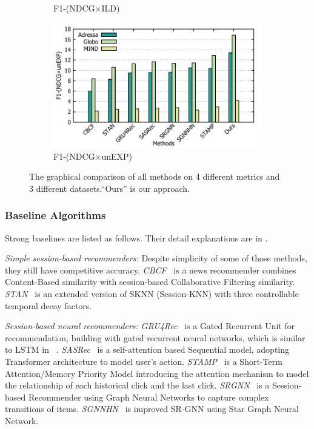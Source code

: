\begin{figure}
\begin{subfigure}[b]{0.8\columnwidth}
  \caption{F1-(NDCG$\times$ILD)}
  \label{fig:ild}
  \end{subfigure}
  \hspace*{5mm}
  \begin{subfigure}[b]{0.8\columnwidth}
  \centering
  \includegraphics[width=\columnwidth]{fig/ndcg-unexp.pdf}
  \caption{F1-(NDCG$\times$unEXP)}
  \label{fig:unexp}
  \end{subfigure}
  \caption{The graphical comparison of all methods on 4 different metrics and 3 different datasets.``Ours'' is our approach.}
  \label{fig:all}
\end{figure}

\subsubsection{Baseline Algorithms}
Strong baselines are listed as follows. Their detail explanations are in .

\textit{Simple session-based recommenders:} Despite simplicity of some of those methods, they still have competitive accuracy. 
\textit{CBCF}~\cite{sottocornola2018session} is a news recommender combines Content-Based similarity with session-based Collaborative Filtering similarity.
\textit{STAN}~\cite{garg2019sequence} is an extended version of SKNN (Session-KNN) with three controllable temporal decay factors.

\textit{Session-based neural recommenders:}
  \textit{GRU4Rec}~\cite{hidasi2015session,hidasi2018recurrent} is a Gated Recurrent Unit for recommendation, building with gated recurrent neural networks, which is similar to LSTM in ~\cite{gabriel2019contextual}.
  \textit{SASRec}~\cite{kang_self-attentive_2018} is a self-attention based Sequential model, adopting Transformer architecture to model user's action.
  \textit{STAMP}~\cite{liu2018stamp} is a Short-Term Attention/Memory Priority Model introducing the attention mechanism to model the relationship of each historical click and the last click.
  \textit{SRGNN}~\cite{wu2019session} is a Session-based Recommender using Graph Neural Networks to capture complex transitions of items.
  \textit{SGNNHN}~\cite{pan2020star} is improved SR-GNN using Star Graph Neural Network.

